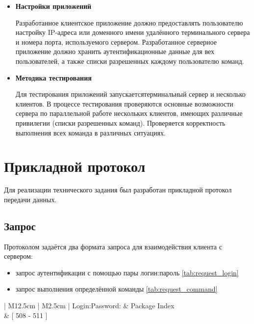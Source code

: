 \begin{itemize}
\item \textbf{Настройки приложений} 

\hspace{14pt} Разработанное клиентское приложение должно предоставлять пользователю настройку IP-адреса или доменного имени удалённого терминального сервера и номера порта, используемого
сервером. Разработанное серверное приложение должно хранить аутентификационные данные для вех пользователей, а также списки разрешенных каждому пользователю команд.

\item \textbf{Методика тестирования} 

\hspace{14pt}  Для тестирования приложений запускаетсятерминальный сервер и несколько клиентов. В процессе тестирования проверяются основные возможности сервера по параллельной работе нескольких клиентов, имеющих различные привилегии (списки разрешенных команд). Проверяется корректность выполнения всех команда в различных ситуациях.

\end{itemize}

\section{Прикладной протокол}

Для реализации технического задания был разработан прикладной протокол передачи данных.

\subsection{Запрос}

Протоколом задаётся два формата запроса для взаимодействия клиента с сервером:

\begin{itemize}
\item запрос аутентификации с помощью пары логин:пароль \ref{tab:request_login}
\item запрос выполнения определённой команды \ref{tab:request_command} 
\end{itemize}

\begin{table}[h]
	\centering
	\begin{tabular}[center]{| M{12.5cm} | M{2.5cm} |}
	\hline
	Login:Password: & Package Index \\ \hline
	[ 0 - 507 ] & [ 508 - 511 ] \\
	\hline
	\end{tabular}
	\caption{Формат запроса аутентификации}
	\label{tab:request_login}
\end{table}

